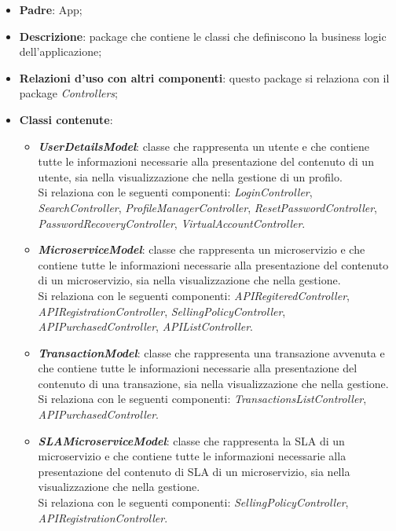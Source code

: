 \begin{itemize}
	\item \textbf{Padre}: App;
	
	\item \textbf{Descrizione}: package che contiene le classi che definiscono la business logic dell'applicazione;
	
	\item \textbf{Relazioni d’uso con altri componenti}: questo package si relaziona con il package \textit{Controllers};
	
	\item \textbf{Classi contenute}:
	\begin{itemize}
		\item \textbf{\textit{UserDetailsModel}}: classe che rappresenta un utente e che contiene tutte le informazioni necessarie alla presentazione del contenuto di un utente, sia nella visualizzazione che nella gestione di un profilo.\\
		Si relaziona con le seguenti componenti: \textit{LoginController}, \textit{SearchController}, \textit{ProfileManagerController}, \textit{ResetPasswordController}, \textit{PasswordRecoveryController}, \textit{VirtualAccountController}.
		
		\item \textbf{\textit{MicroserviceModel}}: classe che rappresenta un microservizio e che contiene tutte le informazioni necessarie alla presentazione del contenuto di un microservizio, sia nella visualizzazione che nella gestione.\\
		Si relaziona con le seguenti componenti: \textit{APIRegiteredController}, \textit{APIRegistrationController}, \textit{SellingPolicyController}, \textit{APIPurchasedController}, \textit{APIListController}.
		
		\item \textbf{\textit{TransactionModel}}:  classe che rappresenta una transazione avvenuta e che contiene tutte le informazioni necessarie alla presentazione del contenuto di una transazione, sia nella visualizzazione che nella gestione.\\
		Si relaziona con le seguenti componenti: \textit{TransactionsListController}, \textit{APIPurchasedController}.
		
		\item \textbf{\textit{SLAMicroserviceModel}}:  classe che rappresenta la SLA di un microservizio e che contiene tutte le informazioni necessarie alla presentazione del contenuto di SLA di un microservizio, sia nella visualizzazione che nella gestione.\\
		Si relaziona con le seguenti componenti: \textit{SellingPolicyController}, \textit{APIRegistrationController}.
	\end{itemize}
\end{itemize}
	

